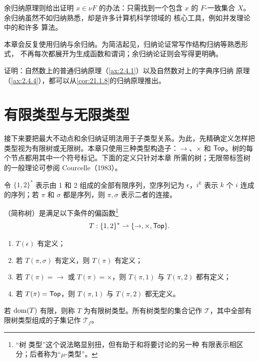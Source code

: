 余归纳原理则给出证明 \(x\in\nu F\) 的办法：只需找到一个包含 \(x\) 的
\(F\)-一致集合 \(X\)。余归纳虽然不如归纳熟悉，却是许多计算机科学领域的
核心工具，例如并发理论中的和许多
算法。


本章会反复使用归纳与余归纳。为简洁起见，归纳论证常写作结构归纳等熟悉形式，
不再每次都展开为生成函数和谓词；余归纳论证则会写得更明确。

\begin{exercise}
\label{ex:21.1.9}
证明：自然数上的普通归纳原理（\cref{ax:2.4.1}）以及自然数对上的字典序归纳
原理（\cref{ax:2.4.4}），都可以从\cref{cor:21.1.8}的归纳原理推出。
\end{exercise}

\section{有限类型与无限类型}
\label{sec:21.2}

接下来要把最大不动点和余归纳证明法用于子类型关系。为此，先精确定义怎样把
类型视为有限树或无限树。本章只使用三种类型构造子：\(\to\)、\(\times\) 和
\(\mathsf{Top}\)。树的每个节点都用其中一个符号标记。下面的定义只针对本章
所需的树；无限带标签树的一般理论可参阅 Courcelle（1983）。

令 \(\{1,2\}^{*}\) 表示由 1 和 2 组成的全部有限序列，空序列记为
\(\epsilon\)，\(i^k\) 表示 \(k\) 个 \(i\) 连成的序列；若 \(\pi\) 和
\(\sigma\) 都是序列，则 \(\pi,\sigma\) 表示二者的连接。

\begin{definition}
\label{def:21.2.1}
（简称树）是满足以下条件的偏函数\footnote{“树
类型”这个说法略显别扭，但有助于和将要讨论的另一种
有限表示相区分；后者称为“\(\mu\)-类型”。}
\[
T:\{1,2\}^{*}\rightharpoonup\{\to,\times,\mathsf{Top}\}.
\]
\begin{enumerate}
  \item \(T(\epsilon)\) 有定义；
  \item 若 \(T(\pi,\sigma)\) 有定义，则 \(T(\pi)\) 有定义；
  \item 若 \(T(\pi)=\to\) 或 \(T(\pi)=\times\)，则
        \(T(\pi,1)\) 与 \(T(\pi,2)\) 都有定义；
  \item 若 \(T(\pi)=\mathsf{Top}\)，则
        \(T(\pi,1)\) 与 \(T(\pi,2)\) 都无定义。
\end{enumerate}
若 \(\operatorname{dom}(T)\) 有限，则称 \(T\) 为有限树类型。所有树类型的集合记作
\(\mathcal T\)，其中全部有限树类型组成的子集记作 \(\mathcal T_f\)。
\end{definition}

